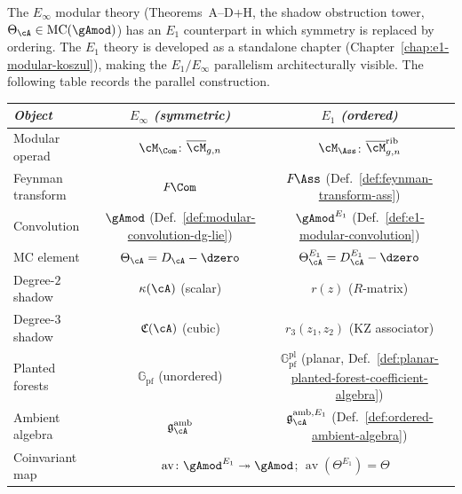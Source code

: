 The $E_\infty$ modular theory (Theorems~A--D+H, the shadow
obstruction tower, $\Theta_\cA \in \mathrm{MC}(\gAmod)$) has an
$E_1$ counterpart in which symmetry is replaced by ordering.
The $E_1$ theory is developed as a standalone chapter
(Chapter~\ref{chap:e1-modular-koszul}), making the $E_1/E_\infty$
parallelism architecturally visible.
The following table records the parallel construction.

\begin{center}
\renewcommand{\arraystretch}{1.15}
\begin{tabular}{lcc}
\toprule
\emph{Object}
 & \emph{$E_\infty$ \textup{(}symmetric\textup{)}}
 & \emph{$E_1$ \textup{(}ordered\textup{)}} \\
\midrule
Modular operad
 & $\cM_{\Com}$: $\overline{\cM}_{g,n}$
 & $\cM_{\Ass}$: $\overline{\cM}_{g,n}^{\mathrm{rib}}$
 \\
Feynman transform
 & $F\!\Com$
 & $F\!\Ass$ (Def.~\ref{def:feynman-transform-ass})
 \\
Convolution
 & $\gAmod$ (Def.~\ref{def:modular-convolution-dg-lie})
 & ${\gAmod}^{E_1}$ (Def.~\ref{def:e1-modular-convolution})
 \\
MC element
 & $\Theta_\cA = D_\cA - \dzero$
 & $\Theta_\cA^{E_1} = D_\cA^{E_1} - \dzero$
 \\
Degree-$2$ shadow
 & $\kappa(\cA)$ (scalar)
 & $r(z)$ ($R$-matrix)
 \\
Degree-$3$ shadow
 & $\mathfrak{C}(\cA)$ (cubic)
 & $r_3(z_1,z_2)$ (KZ associator)
 \\
Planted forests
 & $\mathbb{G}_{\mathrm{pf}}$ (unordered)
 & $\mathbb{G}_{\mathrm{pf}}^{\mathrm{pl}}$ (planar,
 Def.~\ref{def:planar-planted-forest-coefficient-algebra})
 \\
Ambient algebra
 & $\mathfrak{g}^{\mathrm{amb}}_\cA$
 & $\mathfrak{g}^{\mathrm{amb},E_1}_\cA$
 (Def.~\ref{def:ordered-ambient-algebra})
 \\
Coinvariant map
 & \multicolumn{2}{c}{%
 $\operatorname{av}\colon
 {\gAmod}^{E_1} \twoheadrightarrow \gAmod$;
 \quad $\operatorname{av}(\Theta^{E_1}) = \Theta$}
 \\
\bottomrule
\end{tabular}
\end{center}

